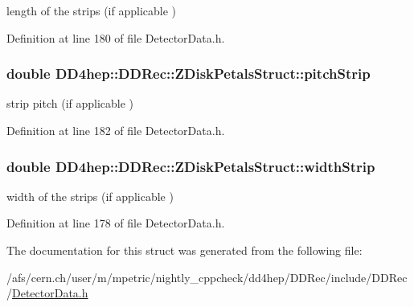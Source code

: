 length of the strips (if applicable ) 

Definition at line 180 of file DetectorData.h.\hypertarget{struct_d_d4hep_1_1_d_d_rec_1_1_z_disk_petals_struct_a73e6274d9327c8e5aa26575ee6679dee}{
\subsubsection[{pitchStrip}]{\setlength{\rightskip}{0pt plus 5cm}double {\bf DD4hep::DDRec::ZDiskPetalsStruct::pitchStrip}}}
\label{struct_d_d4hep_1_1_d_d_rec_1_1_z_disk_petals_struct_a73e6274d9327c8e5aa26575ee6679dee}


strip pitch (if applicable ) 

Definition at line 182 of file DetectorData.h.\hypertarget{struct_d_d4hep_1_1_d_d_rec_1_1_z_disk_petals_struct_a69d3bba6e63772378c1ceb4367a09bcd}{
\subsubsection[{widthStrip}]{\setlength{\rightskip}{0pt plus 5cm}double {\bf DD4hep::DDRec::ZDiskPetalsStruct::widthStrip}}}
\label{struct_d_d4hep_1_1_d_d_rec_1_1_z_disk_petals_struct_a69d3bba6e63772378c1ceb4367a09bcd}


width of the strips (if applicable ) 

Definition at line 178 of file DetectorData.h.

The documentation for this struct was generated from the following file:\begin{DoxyCompactItemize}
\item 
/afs/cern.ch/user/m/mpetric/nightly\_\-cppcheck/dd4hep/DDRec/include/DDRec/\hyperlink{_detector_data_8h}{DetectorData.h}\end{DoxyCompactItemize}
